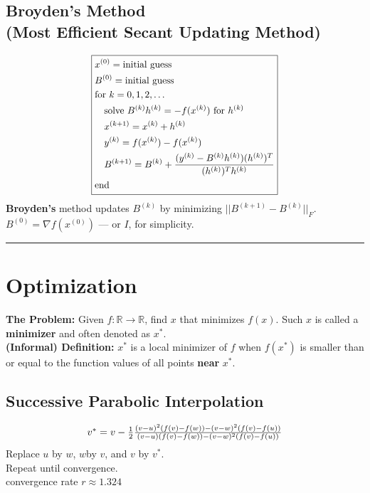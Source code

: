 \documentclass[9pt]{article}
\begin{document}
\begin{multicols}{3}
\hdashrule{\linewidth}{0.5pt}{1mm 1mm}
\vspace{-0.7cm}
\subsection*{Broyden's Method\\\footnotesize{(Most Efficient Secant Updating Method)}}
\[
\boxed{
\scalebox{0.95}{$
\begin{aligned}
    &x^{(0)} = \text{initial guess}\\
    &B^{(0)} = \text{initial guess}\\
    &\text{for } k = 0, 1, 2, \ldots\\
    & \quad \text{solve } B^{(k)}h^{(k)} = -f(x^{(k)}) \text{ for } h^{(k)}\\ 
    & \quad x^{(k+1)} = x^{(k)} + h^{(k)}\\
    & \quad y^{(k)} = f(x^{(k)}) - f(x^{(k)})\\
    & \quad B^{(k+1)} = B^{(k)} + \frac{ (y^{(k)} - B^{(k)}h^{(k)})(h^{(k)})^T }{(h^{(k)})^T h^{(k)}}\\
    & \text{end}
\end{aligned}
$}
}
\]
\textbf{Broyden's} method updates $B^{(k)}$ by minimizing $||B^{(k+1)} - B^{(k)}||_F$.\\

$B^{(0)} = \nabla f(x^{(0)})$ --- or $I$, for simplicity.\\

\hrule
\vspace{-0.3cm}
\section{Optimization}
\textbf{The Problem: } Given $f: \mathbb{R} \rightarrow \mathbb{R}$, find $x$ that minimizes $f(x)$. Such $x$ is called a \textbf{minimizer} and often denoted as $x^*$.\\

\textbf{(Informal) Definition: } $x^*$ is a local minimizer of $f$ when $f(x^*)$ is smaller than or equal to the function values of all points \textbf{near} $x^*$.

\subsection*{Successive Parabolic Interpolation}
\[
\scalebox{1}{$
v^* = v - \frac{1}{2} \frac{(v-u)^2(f(v)-f(w)) - (v-w)^2(f(v)-f(u))}{(v-u)(f(v)-f(w)) - (v-w)^2(f(v)-f(u))}
$}
\]
Replace $u$ by $w$, $w$by $v$, and $v$ by $v^*$. \\Repeat until convergence.\\
convergence rate $r \approx 1.324$


\end{multicols}
\end{document}
